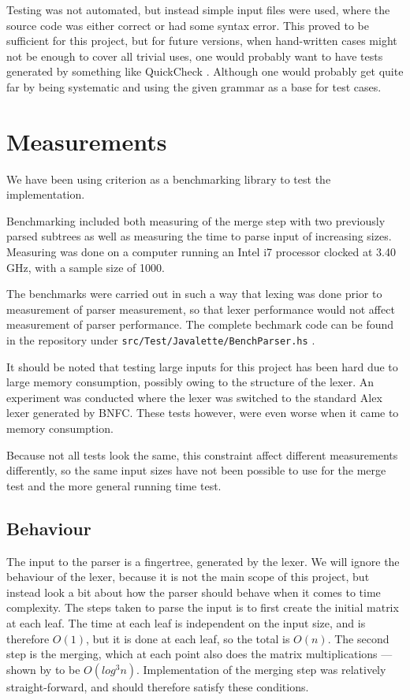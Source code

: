 \documentclass[a4paper,12pt,notitlepage]{report}
\renewcommand\cite{\citep}
\begin{document}
Testing was not automated, but instead simple input files were used, where the
source code was either correct or had some syntax error. This proved to be
sufficient for this project, but for future versions, when hand-written cases
might not be enough to cover all trivial uses, one would probably want to have
tests generated by something like QuickCheck \cite{quickcheck}. Although one
would probably get quite far by being systematic and using the given grammar as
a base for test cases. 

\section{Measurements}
We have been using criterion \cite{criterion} as a benchmarking library to test
the implementation. 

Benchmarking included both measuring of the merge step with
two previously parsed subtrees as well as measuring the time to parse input of
increasing sizes. Measuring was done on a computer running an Intel i7 processor
clocked at 3.40 GHz, with a sample size of 1000. 

The benchmarks were carried out in such a way that lexing was done prior to
measurement of parser measurement, so that lexer performance would not affect
measurement of parser performance. The complete bechmark code can be found in
the repository under \texttt{src/Test/Javalette/BenchParser.hs} \cite{jyp-bnfc}.

It should be noted that testing large inputs for this project has been hard due
to large memory consumption, possibly owing to the structure of the lexer. An
experiment was conducted where the lexer was switched to the standard Alex lexer
generated by BNFC. These tests however, were even worse when it came to memory
consumption.

Because not all tests look the same, this constraint affect different
measurements differently, so the same input sizes have not been possible to use
for the merge test and the more general running time test.

\subsection{Behaviour}
The input to the parser is a fingertree, generated by the lexer. We will ignore
the behaviour of the lexer, because it is not the main scope of this project, but
instead look a bit about how the parser should behave when it comes to time
complexity. The steps taken to parse the input is to first create the initial
matrix at each leaf. The time at each leaf is independent on the input size, and
is therefore $O(1)$, but it is done at each leaf, so the total is $O(n)$. The
second step is the merging, which at each point also does the matrix
multiplications --- shown by \citet{parparsepaper} to be $O(log^3 n)$.
Implementation of the merging step was relatively straight-forward, and should
therefore satisfy these conditions. 
\end{document}
